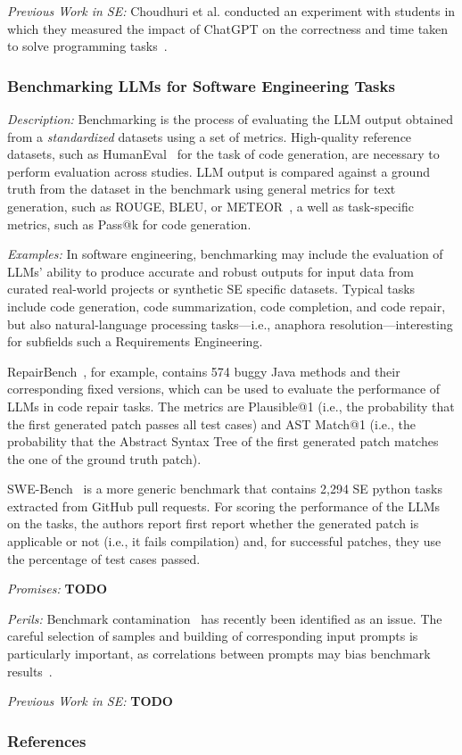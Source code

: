 \documentclass[11pt]{article}
\begin{document}
\emph{Previous Work in SE:}  Choudhuri et al. conducted an experiment with students in which they measured the impact of ChatGPT on the correctness and time taken to solve programming tasks~\cite{DBLP:conf/icse/ChoudhuriLSGS24}.


\subsubsection{Benchmarking LLMs for Software Engineering Tasks}

\emph{Description:} Benchmarking is the process of evaluating the LLM output obtained from a \textit{standardized} datasets using a set of  metrics.
High-quality reference datasets, such as HumanEval~\cite{DBLP:journals/corr/abs-2107-03374} for the task of code generation, are necessary to perform evaluation across studies.
LLM output is compared against a ground truth from the dataset in the benchmark using general metrics for text generation, such as ROUGE, BLEU, or METEOR~\cite{10.1145/3695988}, a well as task-specific metrics, such as Pass@k for code generation.

\emph{Examples:} In software engineering, benchmarking may include the evaluation of LLMs' ability to produce accurate and robust outputs for input data from curated real-world projects or synthetic SE specific datasets. Typical tasks include code generation, code summarization, code completion, and code repair, but also natural-language processing tasks---i.e., anaphora resolution---interesting for subfields such a Requirements Engineering. 

RepairBench~\cite{silva2024repairbench}, for example, contains 574 buggy Java methods and their corresponding fixed versions, which can be used to evaluate the performance of LLMs in code repair tasks.
The metrics are Plausible@1 (i.e., the probability that the first generated patch passes all test cases) and AST Match@1 (i.e., the probability that the Abstract Syntax Tree of the first generated patch matches the one of the ground truth patch).

SWE-Bench~\cite{DBLP:conf/iclr/JimenezYWYPPN24} is a more generic benchmark that contains 2,294 SE python tasks extracted from GitHub pull requests.
For scoring the performance of the LLMs on the tasks, the authors report first report whether the generated patch is applicable or not (i.e., it fails compilation) and, for successful patches, they use the percentage of test cases passed.

\emph{Promises:} \textbf{TODO}

\emph{Perils:} Benchmark contamination~\cite{DBLP:journals/corr/abs-2410-16186} has recently been identified as an issue.
The careful selection of samples and building of corresponding input prompts is particularly important, as correlations between prompts may bias benchmark results~\cite{DBLP:conf/acl/SiskaMAB24}.

\emph{Previous Work in SE:} \textbf{TODO}

\subsubsection{References}



\end{document}
